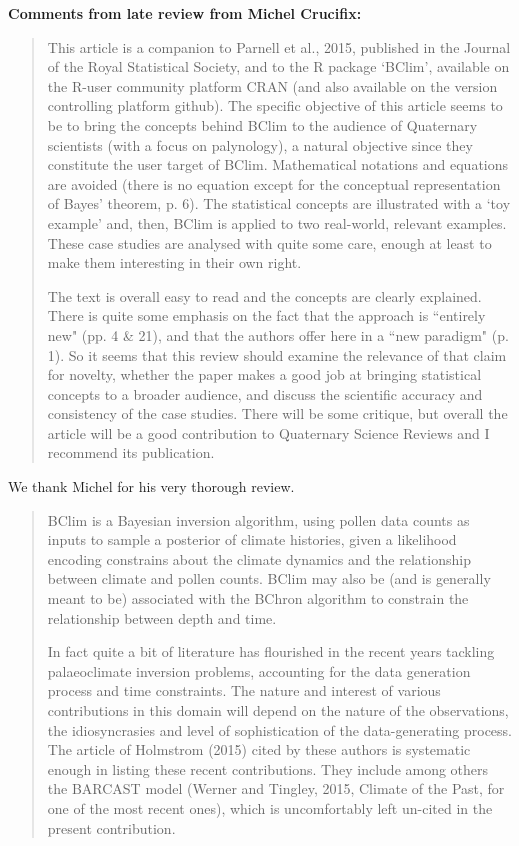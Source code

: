 \documentclass[a4paper,11pt]{article}
\begin{document}
\textbf{Comments from late review from Michel Crucifix:}

\begin{framed} \begin{quote}
This article is a companion to Parnell et al., 2015, published in the Journal of the Royal Statistical Society, and to the R package `BClim', available on the R-user community platform CRAN (and also available on the version controlling platform github). The specific objective of this article seems to be to bring the concepts behind BClim to the audience of Quaternary scientists (with a focus on palynology), a natural objective since they constitute the user target of BClim. Mathematical notations and equations are avoided (there is no equation except for the conceptual representation of Bayes' theorem, p. 6). The statistical concepts are illustrated with a `toy example' and, then, BClim is applied to two real-world, relevant examples. These case studies are analysed with quite some care, enough at least to make them interesting in their own right. 

The text is overall easy to read and the concepts are clearly explained. There is quite some emphasis on the fact that the approach is ``entirely new" (pp. 4 \& 21), and that the authors offer here in a ``new paradigm" (p. 1). So it seems that this review should examine the relevance of that claim for novelty, whether the paper makes a good job at bringing statistical concepts to a broader audience, and discuss the scientific accuracy and consistency of the case studies. There will be some critique, but overall the article will be a good contribution to Quaternary Science Reviews and I recommend its publication.
\end{quote} \end{framed}

We thank Michel for his very thorough review.

\begin{framed} \begin{quote}
BClim is a Bayesian inversion algorithm, using pollen data counts as inputs to sample a posterior of climate histories, given a likelihood encoding constrains about the climate dynamics and the relationship between climate and pollen counts. BClim may also be (and is generally meant to be) associated with the BChron algorithm to constrain the relationship between depth and time. 

In fact quite a bit of literature has flourished in the recent years tackling palaeoclimate inversion problems, accounting for the data generation process and time constraints. 
The nature and interest of various contributions in this domain will depend on the nature of the observations, the idiosyncrasies and level of sophistication of the data-generating process. The article of Holmstrom (2015) cited by these authors is systematic enough in listing these recent contributions. They include among others the BARCAST model (Werner and Tingley, 2015, Climate of the Past, for one of the most recent ones), which is uncomfortably left un-cited in the present contribution. 
\end{quote} \end{framed}
\end{document}

